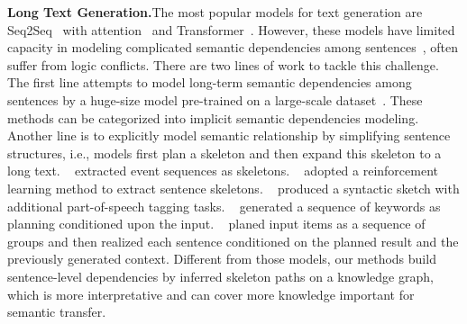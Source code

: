 \documentclass[letterpaper]{article} %
\begin{document}
\medskip\noindent\textbf{Long Text Generation.}\hspace{1em}The most popular models for text generation are Seq2Seq~\cite{sutskever-et-al:seq2seq} 
with attention~\cite{bahdanau-et-al:attention} 
and Transformer~\cite{vaswani-et-al:transformer}. 
However, these models have limited capacity in modeling complicated semantic dependencies among sentences~\cite{wiseman-etal-2017-challenges}, often suffer from logic conflicts.
There are two lines of work to tackle this challenge. 
The first line attempts to model long-term semantic dependencies among sentences by a huge-size model pre-trained on a large-scale dataset~\citep{radford-et-al:gpt2,unifiedlm,mass,gpt2-ke}. These methods can be categorized into implicit semantic dependencies modeling. 
Another line is to explicitly model semantic relationship by simplifying sentence structures, i.e., models first plan a skeleton and then expand this skeleton to a long text. ~\citet{martin-event} extracted event sequences as skeletons.
~\citet{xu-et-al:skeleton_jingjingxu_emnlp8} adopted a reinforcement learning method to extract sentence skeletons. ~\citet{li-et-al:coarse2fine} produced a syntactic sketch with additional part-of-speech tagging tasks. ~\citet{plan-and-write}  generated a sequence of keywords as planning conditioned upon the input.
 ~\citet{long-hunag} planed input items as a sequence of groups  and then realized each sentence conditioned on the planned result and the previously generated context. Different from those models, our methods build sentence-level dependencies by inferred skeleton paths on a knowledge graph, which is more interpretative and can cover more knowledge important for 
semantic transfer.
\end{document}
